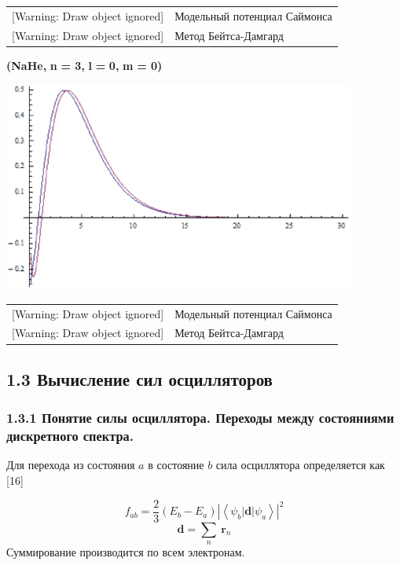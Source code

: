 \begin{tabular}{m{3.741cm}m{12.927cm}}
[Warning: Draw object ignored] &
Модельный потенциал
Саймонса\\
{}[Warning: Draw object ignored] &
Метод
Бейтса-Дамгард\\
\end{tabular}


\bigskip

\textbf{(}\textbf{NaHe}\textbf{, }\textbf{n}\textbf{ = 3,
}\textbf{l}\textbf{ = }\textbf{0}\textbf{,
}\textbf{m}\textbf{ = 0)}

\includegraphics[width=11.592cm,height=6.904cm]{chervinskaya-15.eps}



\begin{tabular}{m{3.741cm}m{12.927cm}}
[Warning: Draw object ignored] &
Модельный потенциал
Саймонса\\
{}[Warning: Draw object ignored] &
Метод
Бейтса-Дамгард\\
\end{tabular}

\clearpage\subsection[1.3 Вычисление
сил осцилляторов]{1.3
Вычисление сил
осцилляторов}
\subsubsection[1.3.1 Понятие
силы осциллятора. Переходы между состояниями дискретного
спектра.]{1.3.1 Понятие
силы осциллятора. Переходы между состояниями дискретного
спектра.}
Для перехода
из состояния $a$
в состояние $b$
сила осциллятора
определяется как [16]

\begin{equation*}
	f_{ab}=
	\frac{2}{3}\left( E_b-E_a \right) \left| \left< \psi_b |\textbf{d}| \psi_a \right> \right|^2
\end{equation*}
\begin{equation*}
{\textbf{d}} = \sum _n\ \textbf{r}_n
\end{equation*}
Суммирование производится по всем электронам.

